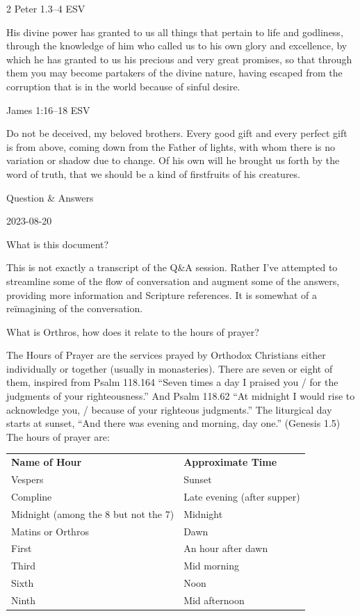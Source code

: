 \documentclass[
]{article}
\begin{document}
2 Peter 1.3--4 ESV

His divine power has granted to us all things that pertain to life and
godliness, through the knowledge of him who called us to his own glory
and excellence, by which he has granted to us his precious and very
great promises, so that through them you may become partakers of the
divine nature, having escaped from the corruption that is in the world
because of sinful desire.

James 1:16--18 ESV

Do not be deceived, my beloved brothers. Every good gift and every
perfect gift is from above, coming down from the Father of lights, with
whom there is no variation or shadow due to change. Of his own will he
brought us forth by the word of truth, that we should be a kind of
firstfruits of his creatures.

Question \& Answers

2023-08-20

What is this document?

This is not exactly a transcript of the Q\&A session. Rather I've
attempted to streamline some of the flow of conversation and augment
some of the answers, providing more information and Scripture
references. It is somewhat of a reïmagining of the conversation.

What is Orthros, how does it relate to the hours of prayer?

The Hours of Prayer are the services prayed by Orthodox Christians
either individually or together (usually in monasteries). There are
seven or eight of them, inspired from Psalm 118.164 ``Seven times a day
I praised you / for the judgments of your righteousness.'' And Psalm
118.62 ``At midnight I would rise to acknowledge you, / because of your
righteous judgments.'' The liturgical day starts at sunset, ``And there
was evening and morning, day one.'' (Genesis 1.5) The hours of prayer
are:

\begin{longtable}[]{@{}
  >{\raggedright\arraybackslash}p{}
  >{\raggedright\arraybackslash}p{}@{}}
\toprule\noalign{}
\endhead
\bottomrule\noalign{}
\endlastfoot
\textbf{Name of Hour} & \textbf{Approximate Time} \\
Vespers & Sunset \\
Compline & Late evening (after supper) \\
Midnight (among the 8 but not the 7) & Midnight \\
Matins or Orthros & Dawn \\
First & An hour after dawn \\
Third & Mid morning \\
Sixth & Noon \\
Ninth & Mid afternoon \\
\end{longtable}
\end{document}
